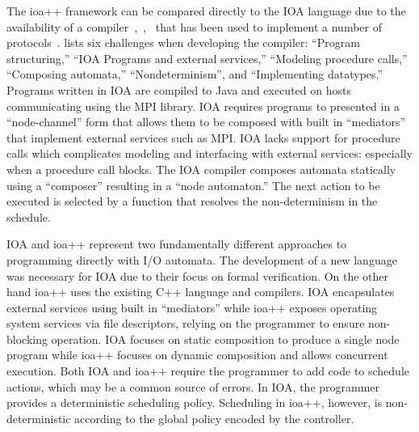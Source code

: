 The ioa++ framework can be compared directly to the IOA language due to the availability of a compiler~\cite{tsai2002code},~\cite{tauber2004verifiable},~\cite{tauber2004compiling} that has been used to implement a number of protocols~\cite{georgiou2009automated}.
\cite{georgiou2009automated} lists six challenges when developing the compiler: ``Program structuring,'' ``IOA Programs and external services,'' ``Modeling procedure calls,'' ``Composing automata,'' ``Nondeterminism'', and ``Implementing datatypes.''
Programs written in IOA are compiled to Java and executed on hosts communicating using the MPI library.
IOA requires programs to presented in a ``node-channel'' form that allows them to be composed with built in ``mediators'' that implement external services such as MPI.
IOA lacks support for procedure calls which complicates modeling and interfacing with external services: especially when a procedure call blocks.
The IOA compiler composes automata statically using a ``composer'' resulting in a ``node automaton.''
The next action to be executed is selected by a function that resolves the non-determinism in the schedule.

IOA and ioa++ represent two fundamentally different approaches to programming directly with I/O automata.
The development of a new language was necessary for IOA due to their focus on formal verification.
On the other hand ioa++ uses the existing C++ language and compilers.
IOA encapsulates external services using built in ``mediators'' while ioa++ exposes operating system services via file descriptors, relying on the programmer to ensure non-blocking operation.
IOA focuses on static composition to produce a single node program while ioa++ focuses on dynamic composition and allows concurrent execution.
Both IOA and ioa++ require the programmer to add code to schedule actions, which may be a common source of errors.
In IOA, the programmer provides a deterministic scheduling policy.
Scheduling in ioa++, however, is non-deterministic according to the global policy encoded by the controller.










